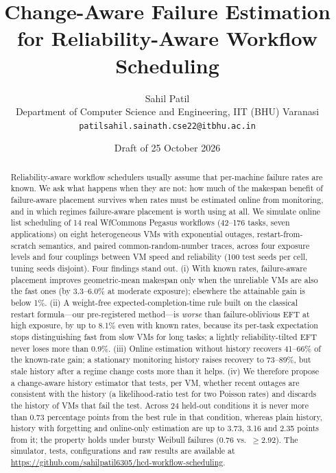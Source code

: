 \documentclass[10pt,twocolumn,letterpaper]{article}
\title{\Large\bfseries Change-Aware Failure Estimation for Reliability-Aware Workflow Scheduling}
\author{Sahil Patil\\Department of Computer Science and Engineering, IIT (BHU) Varanasi\\\texttt{patilsahil.sainath.cse22@itbhu.ac.in}}
\date{Draft of 25 October 2026}
\begin{document}
\maketitle

\begin{abstract}
Reliability-aware workflow schedulers usually assume that per-machine failure rates are
known. We ask what happens when they are not: how much of the makespan benefit of
failure-aware placement survives when rates must be estimated online from monitoring,
and in which regimes failure-aware placement is worth using at all. We simulate online
list scheduling of 14 real WfCommons Pegasus workflows (42--176 tasks, seven applications)
on eight heterogeneous VMs with exponential outages, restart-from-scratch semantics, and
paired common-random-number traces, across four exposure levels and four couplings
between VM speed and reliability (100 test seeds per cell, tuning seeds disjoint).
Four findings stand out. (i) With known rates, failure-aware placement improves
geometric-mean makespan only when the unreliable VMs are also the fast ones
(by 3.3--6.0\% at moderate exposure); elsewhere the attainable gain is below 1\%.
(ii) A weight-free expected-completion-time rule built on the classical restart formula---our
pre-registered method---is \emph{worse} than failure-oblivious EFT at high exposure, by up to 8.1\% even with
known rates, because its per-task expectation stops distinguishing fast from slow VMs for long
tasks; a lightly reliability-tilted EFT never loses more than 0.9\%. (iii) Online
estimation without history recovers 41--66\% of the known-rate gain; a stationary monitoring
history raises recovery to 73--89\%, but stale history after a regime change costs more
than it helps. (iv) We therefore propose a change-aware history estimator that tests, per VM, whether
recent outages are consistent with the history (a likelihood-ratio test for two Poisson rates) and
discards the history of VMs that fail the test. Across 24 held-out conditions it is never more than
0.73 percentage points from the best rule in that condition, whereas plain history, history with
forgetting and online-only estimation are up to 3.73, 3.16 and 2.35 points from it; the property
holds under bursty Weibull failures (0.76 vs.\ $\geq$2.92). The simulator, tests, configurations and raw
results are available at \url{https://github.com/sahilpatil6305/hcd-workflow-scheduling}.
\end{abstract}
\end{document}
